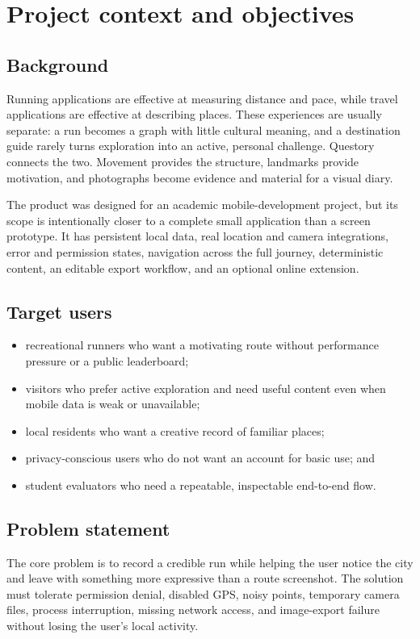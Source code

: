 \section{Project context and objectives}

\subsection{Background}
Running applications are effective at measuring distance and pace, while travel
applications are effective at describing places. These experiences are usually
separate: a run becomes a graph with little cultural meaning, and a destination
guide rarely turns exploration into an active, personal challenge. Questory
connects the two. Movement provides the structure, landmarks provide motivation,
and photographs become evidence and material for a visual diary.

The product was designed for an academic mobile-development project, but its
scope is intentionally closer to a complete small application than a screen
prototype. It has persistent local data, real location and camera integrations,
error and permission states, navigation across the full journey, deterministic
content, an editable export workflow, and an optional online extension.

\subsection{Target users}
\begin{itemize}
  \item recreational runners who want a motivating route without performance
        pressure or a public leaderboard;
  \item visitors who prefer active exploration and need useful content even when
        mobile data is weak or unavailable;
  \item local residents who want a creative record of familiar places;
  \item privacy-conscious users who do not want an account for basic use; and
  \item student evaluators who need a repeatable, inspectable end-to-end flow.
\end{itemize}

\subsection{Problem statement}
The core problem is to record a credible run while helping the user notice the
city and leave with something more expressive than a route screenshot. The
solution must tolerate permission denial, disabled GPS, noisy points, temporary
camera files, process interruption, missing network access, and image-export
failure without losing the user's local activity.

